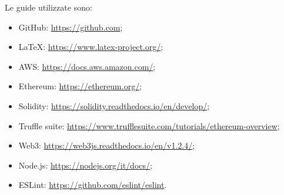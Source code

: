    			Le guide utilizzate sono:
   			\begin{itemize}
   				\item GitHub: \href{https://github.com}{https://github.com};
   				\item \LaTeX: \href{https://www.latex-project.org/}{https://www.latex-project.org/};
   				\item  AWS: \href{https://docs.aws.amazon.com/}{https://docs.aws.amazon.com/};
   				\item Ethereum\glos: \href{https://ethereum.org/}{https://ethereum.org/};
   				\item Solidity: \href{https://solidity.readthedocs.io/en/develop/}{https://solidity.readthedocs.io/en/develop/};
   				\item Truffle suite: \href{https://www.trufflesuite.com/tutorials/ethereum-overview}{https://www.trufflesuite.com/tutorials/ethereum-overview};
   				\item Web3: \href{https://web3js.readthedocs.io/en/v1.2.4/}{https://web3js.readthedocs.io/en/v1.2.4/};
   				\item Node.js: \href{https://nodejs.org/it/docs/}{https://nodejs.org/it/docs/};
   				\item ESLint: \href{https://github.com/eslint/eslint}{https://github.com/eslint/eslint}.
   			\end{itemize}

